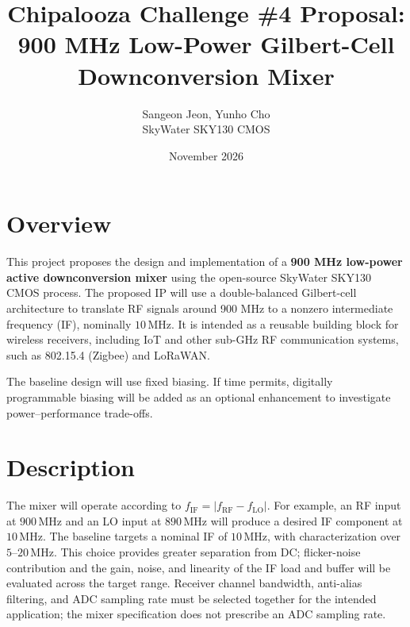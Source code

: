 \documentclass[11pt,letterpaper]{article}
\title{
    \textbf{Chipalooza Challenge \#4 Proposal: 900 MHz Low-Power Gilbert-Cell Downconversion Mixer}
}
\author{
    Sangeon Jeon, Yunho Cho \\%
    SkyWater SKY130 CMOS
}
\date{November 2026}
\begin{document}
\maketitle
\section{Overview}

This project proposes the design and implementation of a \textbf{900 MHz low-power active downconversion mixer} using the open-source SkyWater SKY130 CMOS process.
The proposed IP will use a double-balanced Gilbert-cell architecture to translate RF signals around 900 MHz to a nonzero intermediate frequency (IF), nominally \(10\,\mathrm{MHz}\).
It is intended as a reusable building block for wireless receivers, including IoT and other sub-GHz RF communication systems, such as 802.15.4 (Zigbee) and LoRaWAN.

The baseline design will use fixed biasing.
If time permits, digitally programmable biasing will be added as an optional enhancement to investigate power--performance trade-offs.


\section{Description}

The mixer will operate according to $f_{\mathrm{IF}}=\left|f_{\mathrm{RF}}-f_{\mathrm{LO}}\right|$.
For example, an RF input at \(900\,\mathrm{MHz}\) and an LO input at \(890\,\mathrm{MHz}\) will produce a desired IF component at \(10\,\mathrm{MHz}\).
The baseline targets a nominal IF of \(10\,\mathrm{MHz}\), with characterization over \(5\)--\(20\,\mathrm{MHz}\).
This choice provides greater separation from DC; flicker-noise contribution and the gain, noise, and linearity of the IF load and buffer will be evaluated across the target range.
Receiver channel bandwidth, anti-alias filtering, and ADC sampling rate must be selected together for the intended application; the mixer specification does not prescribe an ADC sampling rate.

\end{document}
